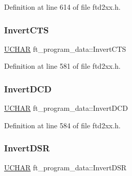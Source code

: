 Definition at line 614 of file ftd2xx.\+h.

\mbox{\label{structft__program__data_a734bfebe12af33d52e2afe07750be245}} 
\subsubsection{\texorpdfstring{Invert\+C\+TS}{InvertCTS}}
{\footnotesize\ttfamily \hyperlink{CatCaloProto40MHz_2inc_2WinTypes_8h_a4f4bb67531a9bf6f0b9c6ad76aeba587}{U\+C\+H\+AR} ft\+\_\+program\+\_\+data\+::\+Invert\+C\+TS}



Definition at line 581 of file ftd2xx.\+h.

\mbox{\label{structft__program__data_a0c0b909429d5c1d25bbe1acfcda19500}} 
\subsubsection{\texorpdfstring{Invert\+D\+CD}{InvertDCD}}
{\footnotesize\ttfamily \hyperlink{CatCaloProto40MHz_2inc_2WinTypes_8h_a4f4bb67531a9bf6f0b9c6ad76aeba587}{U\+C\+H\+AR} ft\+\_\+program\+\_\+data\+::\+Invert\+D\+CD}



Definition at line 584 of file ftd2xx.\+h.

\mbox{\label{structft__program__data_ad7ab73b7989cb83dc2bf31d09d8a7ffa}} 
\subsubsection{\texorpdfstring{Invert\+D\+SR}{InvertDSR}}
{\footnotesize\ttfamily \hyperlink{CatCaloProto40MHz_2inc_2WinTypes_8h_a4f4bb67531a9bf6f0b9c6ad76aeba587}{U\+C\+H\+AR} ft\+\_\+program\+\_\+data\+::\+Invert\+D\+SR}



